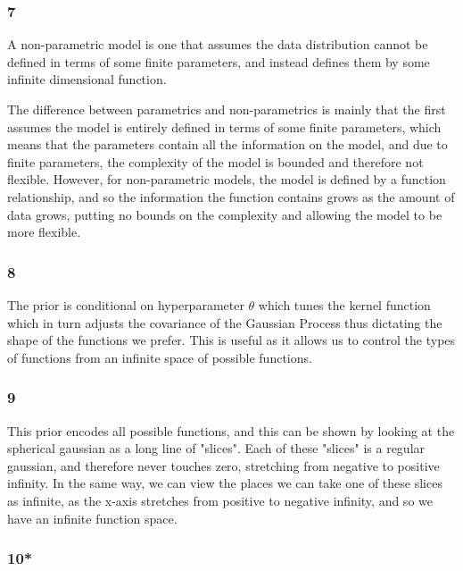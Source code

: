 \documentclass[11pt]{article}
\begin{document}
    \subsubsection{7}\label{section}

A non-parametric model is one that assumes the data distribution cannot
be defined in terms of some finite parameters, and instead defines them
by some infinite dimensional function.

The difference between parametrics and non-parametrics is mainly that
the first assumes the model is entirely defined in terms of some finite
parameters, which means that the parameters contain all the information
on the model, and due to finite parameters, the complexity of the model
is bounded and therefore not flexible. However, for non-parametric
models, the model is defined by a function relationship, and so the
information the function contains grows as the amount of data grows,
putting no bounds on the complexity and allowing the model to be more
flexible.

    \subsubsection{8}\label{section}

The prior is conditional on hyperparameter \(\theta\) which tunes the
kernel function which in turn adjusts the covariance of the Gaussian
Process thus dictating the shape of the functions we prefer. This is
useful as it allows us to control the types of functions from an
infinite space of possible functions.

    \subsubsection{9}\label{section}

This prior encodes all possible functions, and this can be shown by
looking at the spherical gaussian as a long line of "slices". Each of
these "slices" is a regular gaussian, and therefore never touches zero,
stretching from negative to positive infinity. In the same way, we can
view the places we can take one of these slices as infinite, as the
x-axis stretches from positive to negative infinity, and so we have an
infinite function space.

    \subsubsection{10*}\label{section}
\end{document}
